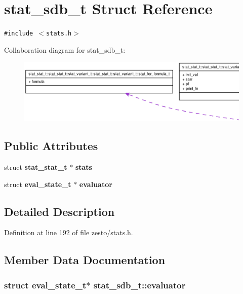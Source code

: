 \section{stat\_\-sdb\_\-t Struct Reference}
\label{structstat__sdb__t}
{\tt \#include $<$stats.h$>$}

Collaboration diagram for stat\_\-sdb\_\-t:\nopagebreak
\begin{figure}[H]
\begin{center}
\leavevmode
\includegraphics[width=400pt]{structstat__sdb__t__coll__graph}
\end{center}
\end{figure}
\subsection*{Public Attributes}
\begin{CompactItemize}
\item 
struct {\bf stat\_\-stat\_\-t} $\ast$ {\bf stats}
\item 
struct {\bf eval\_\-state\_\-t} $\ast$ {\bf evaluator}
\end{CompactItemize}


\subsection{Detailed Description}


Definition at line 192 of file zesto/stats.h.

\subsection{Member Data Documentation}
\subsubsection[{evaluator}]{\setlength{\rightskip}{0pt plus 5cm}struct {\bf eval\_\-state\_\-t}$\ast$ {\bf stat\_\-sdb\_\-t::evaluator}\hspace{0.3cm}{\tt  [read]}}\label{structstat__sdb__t_0732435f2f9582ba461271c8682c1e59}




